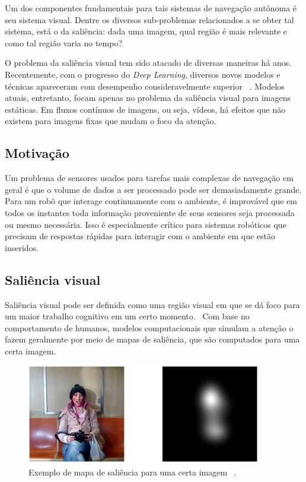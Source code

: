\documentclass[11pt]{article}
\newcommand{\tit}[1]{\textit{#1}}
\begin{document}
Um dos componentes fundamentais para tais sistemas de navegação autônoma é seu
sistema visual.
Dentre os diversos sub-problemas relacionados a se obter
tal sistema, está o da saliência: dada uma imagem, qual região é mais
relevante e como tal região varia no tempo?

O problema da saliência visual tem sido atacado de diversas maneiras há anos.
Recentemente, com o progresso do \tit{Deep Learning}, diversos novos modelos
e técnicas apareceram com desempenho consideravelmente superior
~\cite{ref:mit300-bm}.
Modelos atuais, entretanto, focam apenas no problema da saliência visual
para imagens estáticas.
Em fluxos contínuos de imagens, ou seja, vídeos, há efeitos que não existem
para imagens fixas que mudam o foco da atenção.

\subsection{Motivação}
Um problema de sensores usados para tarefas mais complexas de navegação
em geral
é que o volume de dados a ser processado pode ser demasiadamente grande.
Para um robô que interage continuamente com o ambiente, é improvável que em
todos os instantes  toda informação proveniente de seus sensores seja
processada ou mesmo necessária.
Isso é especialmente crítico para sistemas robóticos que precisam de respostas
rápidas para interagir com o ambiente em que estão inseridos.

\subsection{Saliência visual}
Saliência visual pode ser definida como uma região visual em que se dá
foco para um maior trabalho cognitivo em um certo momento.~\cite{ref:fit}
Com base no comportamento de humanos, modelos computacionais que simulam
a atenção o fazem geralmente por meio de mapas de saliência, que são
computados para uma certa imagem.

\begin{figure}[H]
    \centering
    \includegraphics[width=0.6\linewidth]{imgs/sal_map_1.png}
    \caption{Exemplo de mapa de saliência para uma certa imagem
    ~\cite{ref:salicon}.}
    \label{fig:sal-map}
\end{figure}
\end{document}
